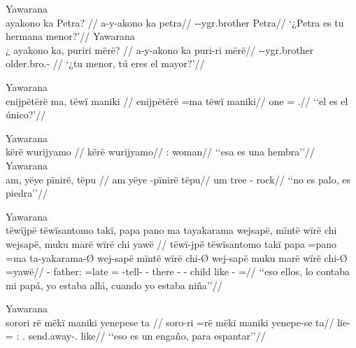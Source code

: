 \documentclass{memoir}
\begin{document}
\pex\label{id-q-npred-nsubj}    \a Yawarana\\
    \label{convamgu-94}        \begingl
        \glpreamble ayakono ka Petra? //
        \gla a-y-akono ka petra//
        \glb {}--ygr.brother  Petra//
            \glft ‘¿Petra es tu hermana menor?’//  
        \endgl 
    \a Yawarana\\
    \label{convamgu-95}        \begingl
        \glpreamble ¿ ayakono ka, puriri mërë? //
        \gla a-y-akono ka puri-ri mërë//
        \glb {}--ygr.brother  older.bro.- //
            \glft ‘¿tu menor, tú eres el mayor?’//  
        \endgl 
\xe

\ex Yawarana \\
\label{id-q-npred-nsubj-maniki}    \begingl
    \glpreamble enijpëtërë ma, tëwï maniki //
    \gla enijpëtërë =ma tëwï maniki//
    \glb one =  .//
        \glft ‘‘el es el único?’//  
    \endgl 
\xe

\pex\label{cat-aff-npred-nsubj}    \a Yawarana\\
    \label{hist2mape-21}        \begingl
        \glpreamble kërë wurijyamo //
        \gla kërë wurijyamo//
        \glb {}: woman//
            \glft ‘‘esa es una hembra’’//  
        \endgl 
    \a Yawarana\\
    \label{histyarirdi-623}        \begingl
        \glpreamble am, yëye pïnirë, tëpu //
        \gla am yëye -pïnirë tëpu//
        \glb um tree - rock//
            \glft ‘‘no es palo, es piedra’’//  
        \endgl 
\xe

\ex Yawarana \\
\label{cat-aff-npred-nsubj-cop}    \begingl
    \glpreamble tëwïjpë tëwïsantomo takï, papa pano ma tayakarama wejsapë, mïntë wïrë chi wejsapë, muku marë wïrë chi yawë //
    \gla tëwï-jpë tëwïsantomo takï papa =pano =ma ta-yakarama-Ø wej-sapë mïntë wïrë chi-Ø wej-sapë muku marë wïrë chi-Ø =yawë//
    \glb {}-   father: =late = -tell- - there  - - child like  - =//
        \glft ‘‘eso ellos, lo contaba mi papá, yo estaba allá, cuando yo estaba niña’’//  
    \endgl 
\xe

\ex Yawarana \\
\label{cat-aff-npred-nsubj-maniki}    \begingl
    \glpreamble sorori rë mëkï maniki yenepese ta //
    \gla soro-ri =rë mëkï maniki yenepe-se ta//
    \glb lie- = : . send.away-. like//
        \glft ‘‘eso es un engaño, para espantar’’//  
    \endgl 
\xe
\end{document}
